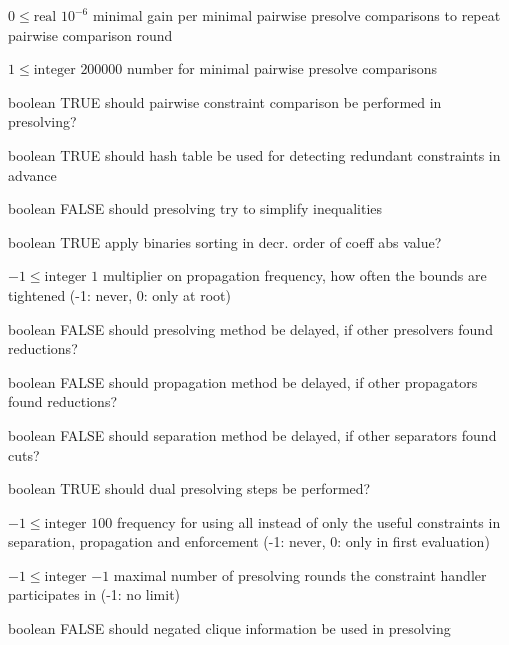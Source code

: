 %
{$0\leq\textrm{real}$}%
{$10^{- 6}$}%
{minimal gain per minimal pairwise presolve comparisons to repeat pairwise comparison round}%
{}

%
{$1\leq\textrm{integer}$}%
{$200000$}%
{number for minimal pairwise presolve comparisons}%
{}

%
{boolean}%
{TRUE}%
{should pairwise constraint comparison be performed in presolving?}%
{}

%
{boolean}%
{TRUE}%
{should hash table be used for detecting redundant constraints in advance}%
{}

%
{boolean}%
{FALSE}%
{should presolving try to simplify inequalities}%
{}

%
{boolean}%
{TRUE}%
{apply binaries sorting in decr. order of coeff abs value?}%
{}

%
{$-1\leq\textrm{integer}$}%
{$1$}%
{multiplier on propagation frequency, how often the bounds are tightened (-1: never, 0: only at root)}%
{}

%
{boolean}%
{FALSE}%
{should presolving method be delayed, if other presolvers found reductions?}%
{}

%
{boolean}%
{FALSE}%
{should propagation method be delayed, if other propagators found reductions?}%
{}

%
{boolean}%
{FALSE}%
{should separation method be delayed, if other separators found cuts?}%
{}

%
{boolean}%
{TRUE}%
{should dual presolving steps be performed?}%
{}

%
{$-1\leq\textrm{integer}$}%
{$100$}%
{frequency for using all instead of only the useful constraints in separation, propagation and enforcement (-1: never, 0: only in first evaluation)}%
{}

%
{$-1\leq\textrm{integer}$}%
{$-1$}%
{maximal number of presolving rounds the constraint handler participates in (-1: no limit)}%
{}

%
{boolean}%
{FALSE}%
{should negated clique information be used in presolving}%
{}

